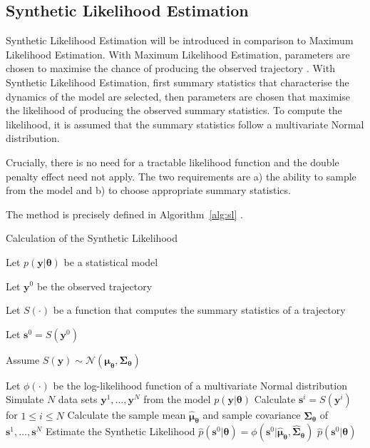 \subsection{Synthetic Likelihood Estimation}
\label{subsec:sl-method}

Synthetic Likelihood Estimation will be introduced in comparison to Maximum Likelihood Estimation. With Maximum Likelihood Estimation, parameters are chosen to maximise the chance of producing the observed trajectory \citep[p.~226]{rossi_2018}. With Synthetic Likelihood Estimation, first summary statistics that characterise the dynamics of the model are selected, then parameters are chosen that maximise the likelihood of producing the observed summary statistics. To compute the likelihood, it is assumed that the summary statistics follow a multivariate Normal distribution.

Crucially, there is no need for a tractable likelihood function and the double penalty effect need not apply. The two requirements are a) the ability to sample from the model and b) to choose appropriate summary statistics.

The method is precisely defined in Algorithm~\ref{alg:sl} \citep{fasiolo_pya_wood_2016}.

\begin{singlespace}
\begin{algorithm}[H]
    \caption{Calculation of the Synthetic Likelihood}
    \label{alg:sl}
    \begin{algorithmic}
        \State Let $p(\pmb{y} | \pmb{\theta})$ be a statistical model
    
        \State Let $\pmb{y}^0$ be the observed trajectory
    
        \State Let $S(\cdot)$ be a function that computes the summary statistics of a trajectory
    
        \State Let $\pmb{s}^0 = S(\pmb{y}^0)$
    
        \State Assume $S(\pmb{y}) \sim \mathcal{N}(\pmb{\mu_\theta}, \pmb{\Sigma_\theta})$
        
        \State Let $\phi(\cdot)$ be the log-likelihood function of a multivariate Normal distribution
        \newline
            \State Simulate $N$ data sets $\pmb{y}^1, \ldots, \pmb{y}^N$ from the model $p(\pmb{y} | \pmb{\theta})$
            \State Calculate $\pmb{s}^i = S(\pmb{y}^i)$ for $1 \leq i \leq N$
            \State Calculate the sample mean $\hat{\pmb{\mu}}_{\pmb{\theta}}$ and sample covariance $\hat{\pmb{\Sigma}}_{\pmb{\theta}}$ of $\pmb{s}^1, \ldots, \pmb{s}^N$
            \State Estimate the Synthetic Likelihood $\hat{p}(\pmb{s}^0 | \pmb{\theta}) = \phi(\pmb{s}^0 | \hat{\pmb{\mu}}_{\pmb{\theta}}, \hat{\pmb{\Sigma}}_{\pmb{\theta}})$
            \State \Return $\hat{p}(\pmb{s}^0 | \pmb{\theta})$
        \EndProcedure
    \end{algorithmic}
\end{algorithm}
\end{singlespace}

